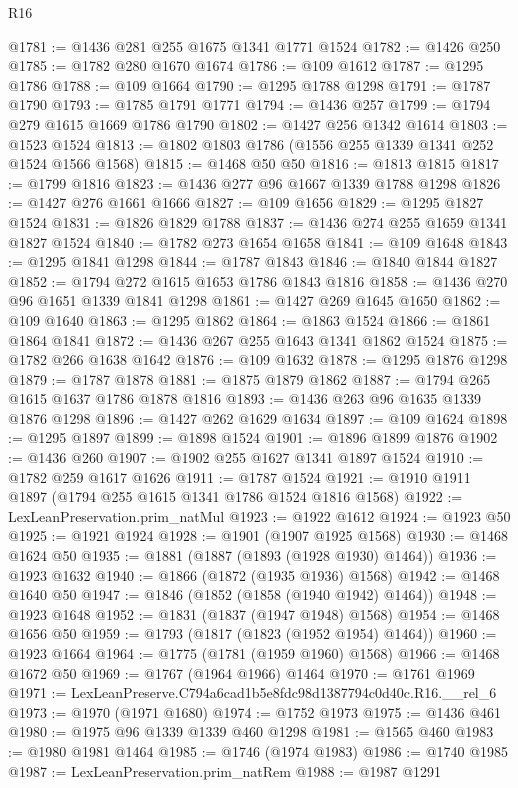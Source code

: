 \begin{lexlean}{R16}
\begin{coremodule}
@1781 := @1436 @281 @255 @1675 @1341 @1771 @1524
@1782 := @1426 @250
@1785 := @1782 @280 @1670 @1674
@1786 := @109 @1612
@1787 := @1295 @1786
@1788 := @109 @1664
@1790 := @1295 @1788 @1298
@1791 := @1787 @1790
@1793 := @1785 @1791 @1771
@1794 := @1436 @257
@1799 := @1794 @279 @1615 @1669 @1786 @1790
@1802 := @1427 @256 @1342 @1614
@1803 := @1523 @1524
@1813 := @1802 @1803 @1786 (@1556 @255 @1339 @1341 @252 @1524 @1566 @1568)
@1815 := @1468 @50 @50
@1816 := @1813 @1815
@1817 := @1799 @1816
@1823 := @1436 @277 @96 @1667 @1339 @1788 @1298
@1826 := @1427 @276 @1661 @1666
@1827 := @109 @1656
@1829 := @1295 @1827 @1524
@1831 := @1826 @1829 @1788
@1837 := @1436 @274 @255 @1659 @1341 @1827 @1524
@1840 := @1782 @273 @1654 @1658
@1841 := @109 @1648
@1843 := @1295 @1841 @1298
@1844 := @1787 @1843
@1846 := @1840 @1844 @1827
@1852 := @1794 @272 @1615 @1653 @1786 @1843 @1816
@1858 := @1436 @270 @96 @1651 @1339 @1841 @1298
@1861 := @1427 @269 @1645 @1650
@1862 := @109 @1640
@1863 := @1295 @1862
@1864 := @1863 @1524
@1866 := @1861 @1864 @1841
@1872 := @1436 @267 @255 @1643 @1341 @1862 @1524
@1875 := @1782 @266 @1638 @1642
@1876 := @109 @1632
@1878 := @1295 @1876 @1298
@1879 := @1787 @1878
@1881 := @1875 @1879 @1862
@1887 := @1794 @265 @1615 @1637 @1786 @1878 @1816
@1893 := @1436 @263 @96 @1635 @1339 @1876 @1298
@1896 := @1427 @262 @1629 @1634
@1897 := @109 @1624
@1898 := @1295 @1897
@1899 := @1898 @1524
@1901 := @1896 @1899 @1876
@1902 := @1436 @260
@1907 := @1902 @255 @1627 @1341 @1897 @1524
@1910 := @1782 @259 @1617 @1626
@1911 := @1787 @1524
@1921 := @1910 @1911 @1897 (@1794 @255 @1615 @1341 @1786 @1524 @1816 @1568)
@1922 := LexLeanPreservation.prim_natMul
@1923 := @1922 @1612
@1924 := @1923 @50
@1925 := @1921 @1924
@1928 := @1901 (@1907 @1925 @1568)
@1930 := @1468 @1624 @50
@1935 := @1881 (@1887 (@1893 (@1928 @1930) @1464))
@1936 := @1923 @1632
@1940 := @1866 (@1872 (@1935 @1936) @1568)
@1942 := @1468 @1640 @50
@1947 := @1846 (@1852 (@1858 (@1940 @1942) @1464))
@1948 := @1923 @1648
@1952 := @1831 (@1837 (@1947 @1948) @1568)
@1954 := @1468 @1656 @50
@1959 := @1793 (@1817 (@1823 (@1952 @1954) @1464))
@1960 := @1923 @1664
@1964 := @1775 (@1781 (@1959 @1960) @1568)
@1966 := @1468 @1672 @50
@1969 := @1767 (@1964 @1966) @1464
@1970 := @1761 @1969
@1971 := LexLeanPreserve.C794a6cad1b5e8fdc98d1387794c0d40c.R16.__rel_6
@1973 := @1970 (@1971 @1680)
@1974 := @1752 @1973
@1975 := @1436 @461
@1980 := @1975 @96 @1339 @1339 @460 @1298
@1981 := @1565 @460
@1983 := @1980 @1981 @1464
@1985 := @1746 (@1974 @1983)
@1986 := @1740 @1985
@1987 := LexLeanPreservation.prim_natRem
@1988 := @1987 @1291

\end{coremodule}
\end{lexlean}
